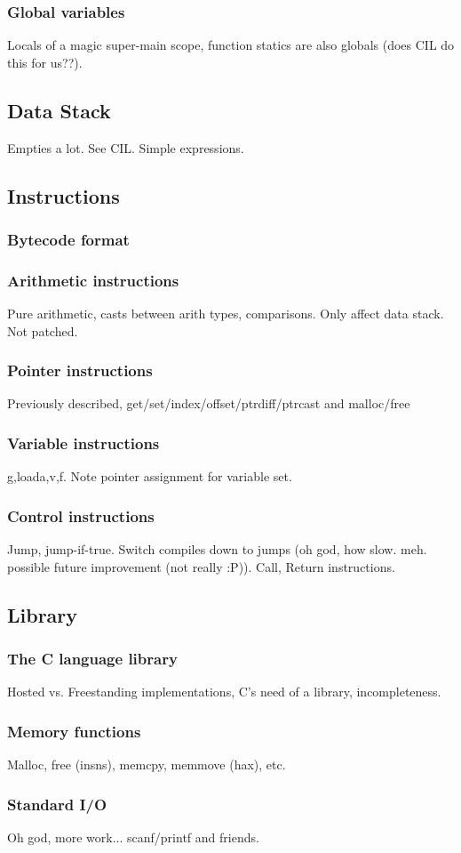 \subsubsection{Global variables}
Locals of a magic super-main scope, function statics are also globals
(does CIL do this for us??).
\subsection{Data Stack}
Empties a lot. See CIL. Simple expressions.
\subsection{Instructions}
\subsubsection{Bytecode format}
\subsubsection{Arithmetic instructions}
Pure arithmetic, casts between arith types, comparisons. Only affect
data stack. Not patched.
\subsubsection{Pointer instructions}
Previously described, get/set/index/offset/ptrdiff/ptrcast and
malloc/free
\subsubsection{Variable instructions}
{g,}load{a,v,f}. Note pointer assignment for variable set.
\subsubsection{Control instructions}
Jump, jump-if-true. Switch compiles down to jumps (oh god, how
slow. meh. possible future improvement (not really :P)). Call, Return
instructions.
\subsection{Library}
\subsubsection{The C language library}
Hosted vs. Freestanding implementations, C's need of a library,
incompleteness.
\subsubsection{Memory functions}
Malloc, free (insns), memcpy, memmove (hax), etc.
\subsubsection{Standard I/O}
Oh god, more work... scanf/printf and friends.